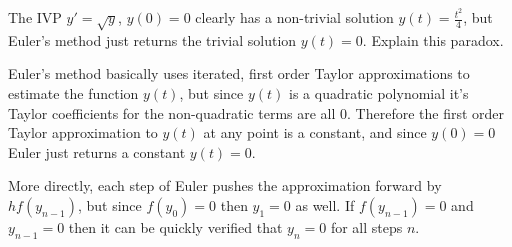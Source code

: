 \documentclass[10pt,a4paper]{article}
\newenvironment{problem}[2][Problem]{\begin{trivlist}
\item[\hskip \labelsep {\bfseries #1}\hskip \labelsep {\bfseries #2.}]}{\end{trivlist}}
\begin{document}
\begin{problem}{2}
The IVP $y' = \sqrt{y}$, $y(0) =0$ clearly has a non-trivial solution $y(t) = \frac{t^2}{4}$, but Euler's method just returns the trivial solution $y(t) = 0$.  Explain this paradox. 
\end{problem}
Euler's method basically uses iterated, first order Taylor approximations to estimate the function $y(t)$, but since $y(t)$ is a quadratic polynomial it's Taylor coefficients for the non-quadratic terms are all $0$.  Therefore the first order Taylor approximation to $y(t)$ at any point is a constant, and since $y(0) = 0$ Euler just returns a constant $y(t) = 0$.

More directly, each step of Euler pushes the approximation forward by $h f(y_{n-1})$, but since $f(y_0) = 0$ then $y_1 = 0$ as well.  If $f(y_{n-1}) = 0$  and $y_{n-1} = 0$ then it can be quickly verified that $y_n =0$ for all steps $n$.
\end{document}
